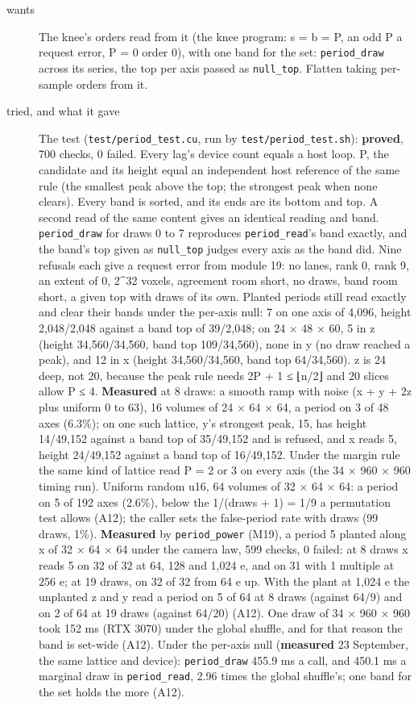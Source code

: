 \begin{description}
\item[{wants}] The knee's orders read from it (the knee program: s = b = P, an odd P a request error, P = 0 order 0), with one band for the set: \texttt{period\_\allowbreak{}draw} across its series, the top per axis passed as \texttt{null\_\allowbreak{}top}. Flatten taking per-sample orders from it.
\item[{tried, and what it gave}] The test (\texttt{test/\allowbreak{}period\_\allowbreak{}test.\allowbreak{}cu}, run by \texttt{test/\allowbreak{}period\_\allowbreak{}test.\allowbreak{}sh}): \textbf{proved}, 700 checks, 0 failed. Every lag's device count equals a host loop. P, the candidate and its height equal an independent host reference of the same rule (the smallest peak above the top; the strongest peak when none clears). Every band is sorted, and its ends are its bottom and top. A second read of the same content gives an identical reading and band. \texttt{period\_\allowbreak{}draw} for draws 0 to 7 reproduces \texttt{period\_\allowbreak{}read}'s band exactly, and the band's top given as \texttt{null\_\allowbreak{}top} judges every axis as the band did. Nine refusals each give a request error from module 19: no lanes, rank 0, rank 9, an extent of 0, 2\textasciicircum{}32 voxels, agreement room short, no draws, band room short, a given top with draws of its own. Planted periods still read exactly and clear their bands under the per-axis null: 7 on one axis of 4,096, height 2,048/2,048 against a band top of 39/2,048; on 24 × 48 × 60, 5 in z (height 34,560/34,560, band top 109/34,560), none in y (no draw reached a peak), and 12 in x (height 34,560/34,560, band top 64/34,560). z is 24 deep, not 20, because the peak rule needs 2P + 1 ≤ ⌊n/2⌋ and 20 slices allow P ≤ 4. \textbf{Measured} at 8 draws: a smooth ramp with noise (x + y + 2z plus uniform 0 to 63), 16 volumes of 24 × 64 × 64, a period on 3 of 48 axes (6.3\%); on one such lattice, y's strongest peak, 15, has height 14/49,152 against a band top of 35/49,152 and is refused, and x reads 5, height 24/49,152 against a band top of 16/49,152. Under the margin rule the same kind of lattice read P = 2 or 3 on every axis (the 34 × 960 × 960 timing run). Uniform random u16, 64 volumes of 32 × 64 × 64: a period on 5 of 192 axes (2.6\%), below the 1/(draws + 1) = 1/9 a permutation test allows (A12); the caller sets the false-period rate with draws (99 draws, 1\%). \textbf{Measured} by \texttt{period\_\allowbreak{}power} (M19), a period 5 planted along x of 32 × 64 × 64 under the camera law, 599 checks, 0 failed: at 8 draws x reads 5 on 32 of 32 at 64, 128 and 1,024 e, and on 31 with 1 multiple at 256 e; at 19 draws, on 32 of 32 from 64 e up. With the plant at 1,024 e the unplanted z and y read a period on 5 of 64 at 8 draws (against 64/9) and on 2 of 64 at 19 draws (against 64/20) (A12). One draw of 34 × 960 × 960 took 152 ms (RTX 3070) under the global shuffle, and for that reason the band is set-wide (A12). Under the per-axis null (\textbf{measured} 23 September, the same lattice and device): \texttt{period\_\allowbreak{}draw} 455.9 ms a call, and 450.1 ms a marginal draw in \texttt{period\_\allowbreak{}read}, 2.96 times the global shuffle's; one band for the set holds the more (A12). 
\end{description}
